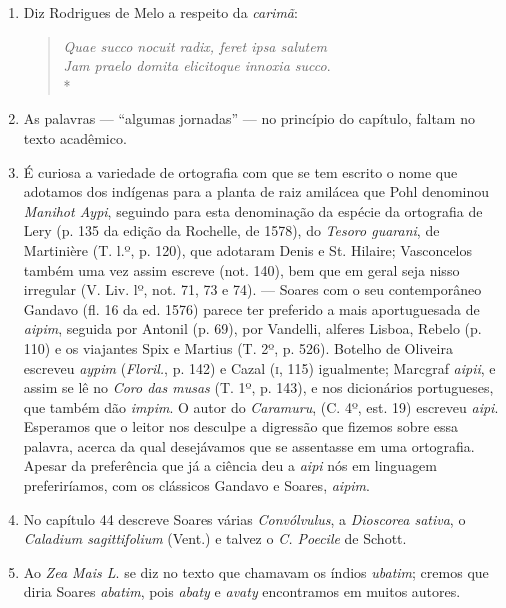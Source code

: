 \begin{enumerate}
\item  Diz Rodrigues de Melo a respeito da \textit{carimã}:
\begin{verse}
\textit{Quae succo nocuit radix, feret ipsa \qb{}salutem\\
Jam praelo domita elicitoque innoxia \qb{}succo}. \\*
\end{verse}


\item As palavras --- ``algumas jornadas'' --- no princípio do capítulo, faltam no texto 
acadêmico.

\item É curiosa a variedade de ortografia com que se tem escrito o nome que adotamos 
dos indígenas para a planta de raiz amilácea que Pohl denominou \textit{Manihot Aypi}, 
seguindo para esta denominação da espécie da ortografia de Lery (p. 135 da edição da 
Rochelle, de 1578), do \textit{Tesoro guarani}, de Martinière (T. l.º, p. 120), que adotaram 
Denis e St. Hilaire; Vasconcelos também uma vez assim escreve (not. 140), bem que em 
geral seja nisso irregular (V. Liv. lº, not. 71, 73 e 74). --- Soares com o seu contemporâneo 
Gandavo (fl. 16 da ed. 1576) parece ter preferido a mais aportuguesada de \textit{aipim}, 
seguida por Antonil (p. 69), por Vandelli, alferes Lisboa, Rebelo (p. 110) e os viajantes 
Spix e Martius (T. 2º, p. 526). Botelho de Oliveira escreveu \textit{aypim} (\textit{Floril.}, p. 142) e 
Cazal (\textsc{i}, 115) igualmente; Marcgraf \textit{aipii}, e assim se lê no \textit{Coro das musas} (T. 1º, p. 
143), e nos dicionários portugueses, que também dão \textit{impim}. O autor do \textit{Caramuru}, (C. 
4º, est. 19) escreveu \textit{aipi}.
Esperamos que o leitor nos desculpe a digressão que fizemos sobre essa palavra, acerca 
da qual desejávamos que se assentasse em uma ortografia. Apesar da preferência que já a 
ciência deu a \textit{aipi} nós em linguagem preferiríamos, com os clássicos Gandavo e Soares, \textit{aipim}.

\item No capítulo 44 descreve Soares várias \textit{Convólvulus}, a \textit{Dioscorea sativa}, 
o \textit{Caladium sagittifolium} (Vent.) e talvez o \textit{C. Poecile} de Schott.

\item Ao \textit{Zea Mais L}. se diz no texto que chamavam os índios \textit{ubatim}; cremos que diria 
Soares \textit{abatim}, pois \textit{abaty} e \textit{avaty} encontramos em muitos autores.


\end{enumerate}
